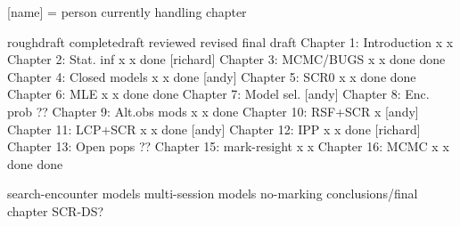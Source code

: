 [name] = person currently handling chapter


                          roughdraft   completedraft  reviewed  revised  final draft
Chapter 1: Introduction       x              x
Chapter 2: Stat. inf          x              x         done     [richard]
Chapter 3: MCMC/BUGS          x              x         done      done
Chapter 4: Closed models      x              x         done     [andy]
Chapter 5: SCR0               x              x         done      done
Chapter 6: MLE                x              x         done      done
Chapter 7: Model sel.       [andy]
Chapter 8: Enc. prob        ??
Chapter 9: Alt.obs mods       x              x         done    
Chapter 10: RSF+SCR           x           [andy]
Chapter 11: LCP+SCR           x              x         done     [andy]
Chapter 12: IPP               x              x         done     [richard]
Chapter 13: Open pops       ??
Chapter 15: mark-resight      x              x        
Chapter 16: MCMC              x              x         done      done


search-encounter models
multi-session models
no-marking 
conclusions/final chapter
SCR-DS?


